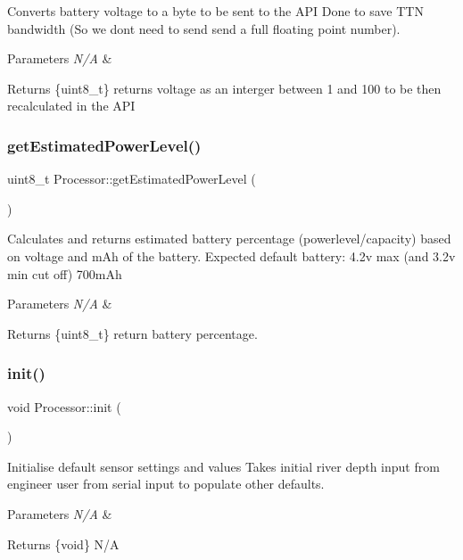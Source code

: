 Converts battery voltage to a byte to be sent to the A\+PI Done to save T\+TN bandwidth (So we don\textquotesingle{}t need to send send a full floating point number). 
\begin{DoxyParams}{Parameters}
{\em N/A} & \\
\hline
\end{DoxyParams}
\begin{DoxyReturn}{Returns}
\{uint8\+\_\+t\} returns voltage as an interger between 1 and 100 to be then recalculated in the A\+PI 
\end{DoxyReturn}
\mbox{\label{class_processor_a78b74d3be91182a263f77ff0f250408d}} 
\subsubsection{\texorpdfstring{get\+Estimated\+Power\+Level()}{getEstimatedPowerLevel()}}
{\footnotesize\ttfamily uint8\+\_\+t Processor\+::get\+Estimated\+Power\+Level (\begin{DoxyParamCaption}{ }\end{DoxyParamCaption})}

Calculates and returns estimated battery percentage (powerlevel/capacity) based on voltage and m\+Ah of the battery. Expected default battery\+: 4.\+2v max (and 3.\+2v min cut off) 700m\+Ah 
\begin{DoxyParams}{Parameters}
{\em N/A} & \\
\hline
\end{DoxyParams}
\begin{DoxyReturn}{Returns}
\{uint8\+\_\+t\} return battery percentage. 
\end{DoxyReturn}
\mbox{\label{class_processor_a22e869ee49d974ad0ee7ee81961ab88f}} 
\subsubsection{\texorpdfstring{init()}{init()}}
{\footnotesize\ttfamily void Processor\+::init (\begin{DoxyParamCaption}{ }\end{DoxyParamCaption})}

Initialise default sensor settings and values Takes initial river depth input from engineer user from serial input to populate other defaults. 
\begin{DoxyParams}{Parameters}
{\em N/A} & \\
\hline
\end{DoxyParams}
\begin{DoxyReturn}{Returns}
\{void\} N/A 
\end{DoxyReturn}
\mbox{\label{class_processor_aa60b755d3022b3b0f83f654e2b7e2e1d}} 
